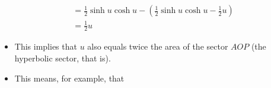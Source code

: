 \documentclass[../main.tex]{subfiles}
\begin{document}
\begin{itemize}
\begin{align*}
        &= \frac{1}{2}\sinh u\cosh u - \left( \frac{1}{2}\sinh u\cosh u-\frac{1}{2}u \right)\\
        &= \frac{1}{2}u
    \end{align*}
    \endgroup
    \begin{itemize}
        \item This implies that $u$ also equals twice the area of the sector $AOP$ (the hyperbolic sector, that is).
        \item This means, for example, that 
    \end{itemize}
\end{itemize}
\end{document}
